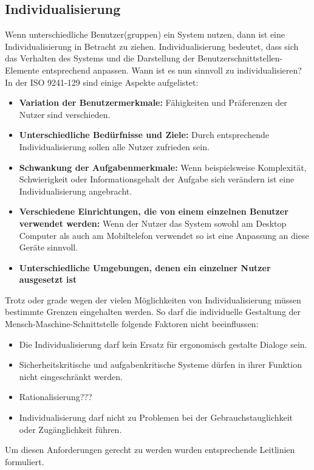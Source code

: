\subsection{Individualisierung}
Wenn unterschiedliche Benutzer(gruppen) ein System nutzen, dann ist eine Individualisierung in Betracht zu ziehen. Individualisierung bedeutet, dass sich das Verhalten des Systems und die Darstellung der Benutzerschnittstellen-Elemente entsprechend anpassen. Wann ist es nun sinnvoll zu individualisieren? In der ISO 9241-129 \cite{ISO9241-129} sind einige Aspekte aufgelistet:
\begin{itemize}
\item \textbf{Variation der Benutzermerkmale:} Fähigkeiten und Präferenzen der Nutzer sind verschieden.
\item \textbf{Unterschiedliche Bedürfnisse und Ziele:} Durch entsprechende Individualisierung sollen alle Nutzer zufrieden sein.
\item \textbf{Schwankung der Aufgabenmerkmale:} Wenn beispielsweise Komplexität, Schwierigkeit oder Informationsgehalt der Aufgabe sich verändern ist eine Individualisierung angebracht.
\item \textbf{Verschiedene Einrichtungen, die von einem einzelnen Benutzer verwendet werden:} Wenn der Nutzer das System sowohl am Desktop Computer als auch am Mobiltelefon verwendet so ist eine Anpassung an diese Geräte sinnvoll.
\item \textbf{Unterschiedliche Umgebungen, denen ein einzelner Nutzer ausgesetzt ist}
\end{itemize}
Trotz oder grade wegen der vielen Möglichkeiten von Individualisierung müssen bestimmte Grenzen eingehalten werden. So darf die individuelle Gestaltung der Mensch-Maschine-Schnittstelle folgende Faktoren nicht beeinflussen:
\begin{itemize}
\item Die Individualisierung darf kein Ersatz für ergonomisch gestalte Dialoge sein.
\item Sicherheitskritische und aufgabenkritische Systeme dürfen in ihrer Funktion nicht eingeschränkt werden.
\item Rationalisierung???
\item Individualisierung darf nicht zu Problemen bei der Gebrauchstauglichkeit oder Zugänglichkeit führen.
\end{itemize}
Um diesen Anforderungen gerecht zu werden wurden entsprechende Leitlinien formuliert. 
